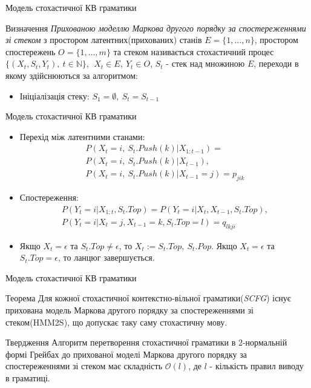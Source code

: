 \documentclass{beamer}
\begin{document}
\begin{darkframes}
    \begin{frame}{Модель стохастичної КВ граматики}
      \begin{exampleblock}{Визначення}
        \textit{Прихованою моделлю Маркова другого порядку за спостереженнями зі стеком} з простором латентних(прихованих) станів $E = \{ 1,\dots,n \}$, простором спостережень $O = \{ 1,\dots,m \}$ та стеком  називається стохастичний процес $ \{ (X_t, S_t, Y_t),\ t \in \mathbb{N} \},\ \ X_t \in E,\ Y_t \in O $, $S_t$ - стек над множиною $E$, переходи в якому здійснюються за алгоритмом:
        \begin{itemize}
          \item Ініціалізація стеку: $S_1 = \emptyset,\ S_t = S_{t-1}$

        \end{itemize}
      \end{exampleblock}
    \end{frame}

    \begin{frame}{Модель стохастичної КВ граматики}
      \begin{itemize}
        \item Перехід між латентними станами:
        \begin{multline}
          P(X_t = i,\ S_t.Push(k) | X_{1:t-1}) = \\
          P(X_t = i,\ S_t.Push(k) | X_{t-1}),\\
          P(X_t = i,\ S_t.Push(k) | X_{t-1} = j) = p_{jik}
        \end{multline}
        \item Спостереження:
        \begin{multline}
          P(Y_t = i | X_{1:t}, S_t.Top ) = P(Y_t = i | X_t, X_{t-1}, S_t.Top),\\
          P(Y_t = i | X_t = j, X_{t-1} = k, S_t.Top = l) = q_{lkji}
        \end{multline}
        \item Якщо $X_t = \epsilon$ та $ S_t.Top \neq \epsilon $, то $ X_t := S_t.Top,\ S_t.Pop $. Якщо $X_t = \epsilon$ та $ S_t.Top = \epsilon $, то ланцюг завершується.
      \end{itemize}
    \end{frame}

    \begin{frame}{Модель стохастичної КВ граматики}
      \begin{block}{Теорема}
        Для кожної стохастичної контекстно-вільної граматики(\textit{SCFG}) існує прихована модель Маркова другого порядку за спостереженнями зі стеком(\alert{HMM2S}), що допускає таку саму стохастичну мову.
      \end{block}
      \begin{block}{Твердження}
      Алгоритм перетворення стохастичної граматики в 2-нормальній формі Грейбах до прихованої моделі Маркова другого порядку за спостереженнями зі стеком має складність $\mathcal{O}(l)$, де $l$ - кількість правил виводу в граматиці.
      \end{block}


\end{frame}
\end{darkframes}
\end{document}

